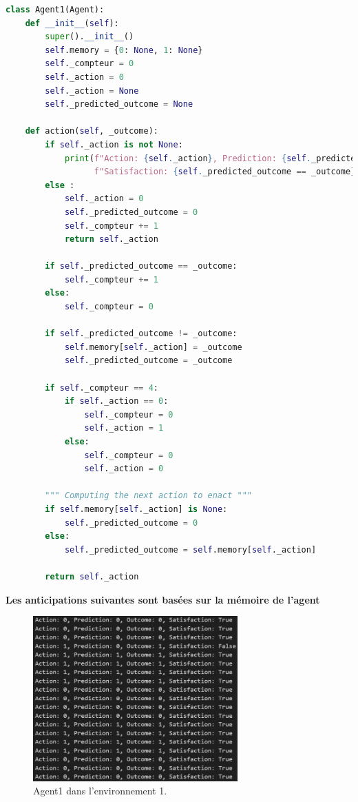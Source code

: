 \documentclass[a4paper, 12pt]{article}
\begin{document}
\begin{lstlisting}[language=Python, caption={Implementation de l'Agent1}]
    class Agent1(Agent):
    def __init__(self):
        super().__init__()
        self.memory = {0: None, 1: None}
        self._compteur = 0
        self._action = 0
        self._action = None
        self._predicted_outcome = None
        
    def action(self, _outcome):
        if self._action is not None:
            print(f"Action: {self._action}, Prediction: {self._predicted_outcome}, Outcome: {_outcome}, " 
                  f"Satisfaction: {self._predicted_outcome == _outcome}")
        else :
            self._action = 0
            self._predicted_outcome = 0
            self._compteur += 1
            return self._action

        if self._predicted_outcome == _outcome:
            self._compteur += 1
        else:
            self._compteur = 0
            
        if self._predicted_outcome != _outcome:
            self.memory[self._action] = _outcome
            self._predicted_outcome = _outcome

        if self._compteur == 4:
            if self._action == 0:
                self._compteur = 0
                self._action = 1
            else:
                self._compteur = 0
                self._action = 0

        """ Computing the next action to enact """
        if self.memory[self._action] is None:
            self._predicted_outcome = 0
        else:
            self._predicted_outcome = self.memory[self._action]
        
        return self._action
\end{lstlisting}

\bigskip

\noindent \large \textbf{Les anticipations suivantes sont basées sur la mémoire de l'agent}
\normalsize

\begin{figure}[h]
    \centering
    \includegraphics[width=0.7\textwidth]{ReportImages/Agent1/Agent1_Env1.png}
    \caption{Agent1 dans l'environnement 1.}
    \label{fig:agent1_env1}
\end{figure}
\end{document}
